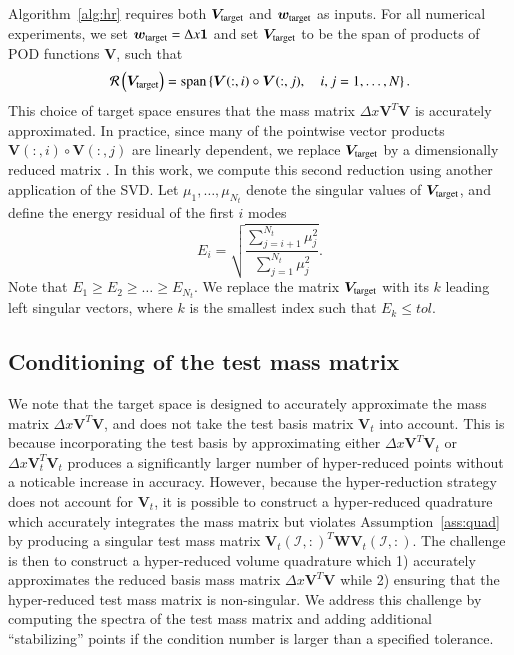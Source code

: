 \documentclass[preprint,10pt]{elsarticle}
\theoremstyle{definition}
\theoremstyle{lemma}
\theoremstyle{theorem}
\theoremstyle{assumption}
\newcommand{\LRp}[1]{\left( #1 \right)}
\newcommand{\LRc}[1]{\left\{ #1 \right\}}
\newcommand{\note}[1]{{\color{blue}{#1}}}
\begin{document}
Algorithm~\ref{alg:hr} requires both $\bm{V}_{\rm target}$ and $\bm{w}_{\rm target}$ as inputs. For all numerical experiments, we set $\bm{w}_{\rm target} = \Delta x \bm{1}$ and set $\bm{V}_{\rm target}$ to be the span of products of POD functions $\bm{V}$, such that
\begin{equation}
\mathcal{R}\LRp{\bm{V}_{\rm target}} = {\rm span}\LRc{\bm{V}(:,i) \circ \bm{V}(:,j), \quad i,j = 1,\ldots, N}.
\label{eq:Vtarget}
\end{equation}
This choice of target space ensures that the mass matrix $\Delta x \bm{V}^T\bm{V}$ is accurately approximated.  In practice, since many of the pointwise vector products $\bm{V}(:,i) \circ \bm{V}(:,j)$ are linearly dependent, we replace $\bm{V}_{\rm target}$ by a dimensionally reduced matrix \cite{hernandez2017dimensional}.  In this work, we compute this second reduction using another application of the SVD.  Let $\mu_{1}, \ldots, \mu_{N_t}$ denote the singular values of $\bm{V}_{\rm target}$, and define the energy residual of the first $i$ modes
\begin{equation}
E_i = \sqrt{\frac{\sum_{j=i+1}^{N_t} \mu_j^2}{\sum_{j=1}^{N_t} \mu_j^2}}.  
\label{eq:svdenergy}
\end{equation}
Note that $E_1 \geq E_2 \geq \ldots \geq E_{N_t}$.  We replace the matrix $\bm{V}_{\rm target}$ with its $k$ leading left singular vectors, where $k$ is the smallest index such that $E_{k} \leq tol$.  

\subsection{Conditioning of the test mass matrix}
\label{sec:condtest}
We note that the target space is designed to accurately approximate the mass matrix $\Delta x \bm{V}^T\bm{V}$, and does not take the test basis matrix $\bm{V}_{t}$ into account.  This is because incorporating the test basis by approximating either $\Delta x \bm{V}^T\bm{V}_{t}$ or $\Delta x \bm{V}_{t}^T\bm{V}_{t}$ produces a significantly larger number of hyper-reduced points without a noticable increase in accuracy.  
However, because the hyper-reduction strategy does not account for $\bm{V}_{t}$, it is possible to construct a hyper-reduced quadrature which accurately integrates the mass matrix but violates Assumption~\ref{ass:quad} by producing a singular test mass matrix $\bm{V}_t\LRp{\mathcal{I},:}^T\bm{W}\bm{V}_t\LRp{\mathcal{I},:}$.  
The challenge is then to construct a hyper-reduced volume quadrature which 1) accurately approximates the reduced basis mass matrix $\Delta x \bm{V}^T\bm{V}$ while 2) ensuring that the hyper-reduced test mass matrix is non-singular.  We address this challenge by computing the spectra of the test mass matrix  and adding additional ``stabilizing'' points if the condition number is larger than a specified tolerance.  
\end{document}
